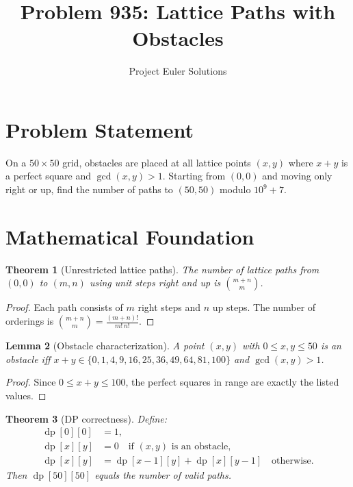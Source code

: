 \documentclass[11pt]{article}
\title{Problem 935: Lattice Paths with Obstacles}
\author{Project Euler Solutions}
\date{}
\newtheorem{theorem}{Theorem}
\newtheorem{lemma}[theorem]{Lemma}
\theoremstyle{definition}
\begin{document}
\maketitle

\section{Problem Statement}

On a $50 \times 50$ grid, obstacles are placed at all lattice points $(x, y)$ where $x + y$ is a perfect square and $\gcd(x, y) > 1$. Starting from $(0, 0)$ and moving only right or up, find the number of paths to $(50, 50)$ modulo $10^9 + 7$.

\section{Mathematical Foundation}

\begin{theorem}[Unrestricted lattice paths]
The number of lattice paths from $(0,0)$ to $(m,n)$ using unit steps right and up is $\binom{m+n}{m}$.
\end{theorem}

\begin{proof}
Each path consists of $m$ right steps and $n$ up steps. The number of orderings is $\binom{m+n}{m} = \frac{(m+n)!}{m!\,n!}$.
\end{proof}

\begin{lemma}[Obstacle characterization]
A point $(x, y)$ with $0 \leq x, y \leq 50$ is an obstacle iff $x + y \in \{0, 1, 4, 9, 16, 25, 36, 49, 64, 81, 100\}$ and $\gcd(x, y) > 1$.
\end{lemma}

\begin{proof}
Since $0 \leq x + y \leq 100$, the perfect squares in range are exactly the listed values.
\end{proof}

\begin{theorem}[DP correctness]
Define:
\begin{align*}
\operatorname{dp}[0][0] &= 1, \\
\operatorname{dp}[x][y] &= 0 \quad \text{if $(x,y)$ is an obstacle}, \\
\operatorname{dp}[x][y] &= \operatorname{dp}[x-1][y] + \operatorname{dp}[x][y-1] \quad \text{otherwise}.
\end{align*}
Then $\operatorname{dp}[50][50]$ equals the number of valid paths.
\end{theorem}
\end{document}
